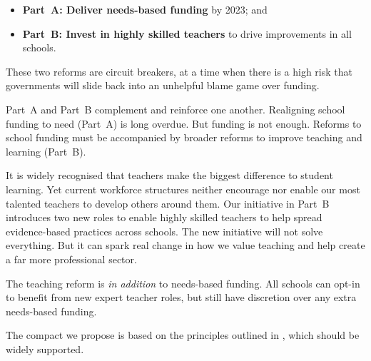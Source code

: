 \documentclass{grattan}
\begin{document}
\begin{itemize}
\item
  \textbf{Part~A: Deliver needs-based funding} by 2023; and
\item
  \textbf{Part~B: Invest in highly skilled teachers} to drive improvements in all schools.
\end{itemize}

These two reforms are circuit breakers, at a time when there is a high risk that governments will slide back into an unhelpful blame game over funding.

Part~A and Part~B complement and reinforce one another.
Realigning school funding to need (Part~A) is long overdue.
But funding is not enough.
Reforms to school funding must be accompanied by broader reforms to improve teaching and learning (Part~B).

It is widely recognised that teachers make the biggest difference to student learning.
Yet current workforce structures neither encourage nor enable our most talented teachers to develop others around them.
Our initiative in Part~B introduces two new roles to enable highly skilled teachers to help spread evidence-based practices across schools.
The new initiative will not solve everything.
But it can spark real change in how we value teaching and help create a far more professional sector.

The teaching reform is \emph{in addition} to needs-based funding. All schools can opt-in to benefit from new expert teacher roles, but still have discretion over any extra needs-based funding.

The compact we propose is based on the principles outlined in , which should be widely supported.
\end{document}
